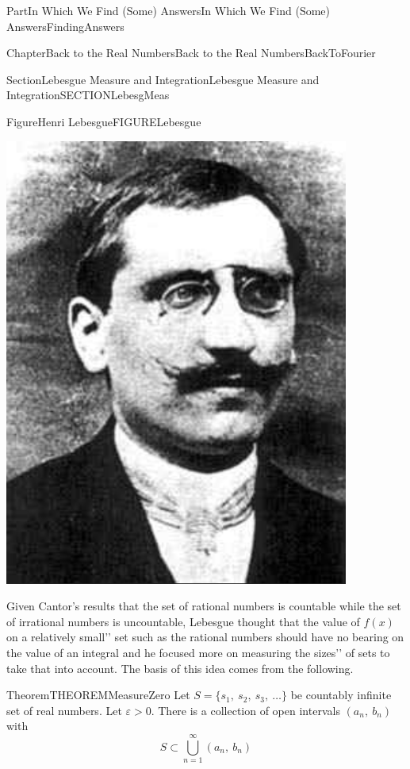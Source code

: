 \documentclass[oneside,10pt,]{book}
\numberwithin{equation}{part}
\newcommand{\eps}{\varepsilon}
\begin{document}
\begin{partptx}{Part}{In Which We Find (Some) Answers}{}{In Which We Find (Some) Answers}{}{}{FindingAnswers}
\begin{chapterptx}{Chapter}{Back to the Real Numbers}{}{Back to the Real Numbers}{}{}{BackToFourier}
\begin{sectionptx}{Section}{Lebesgue Measure and Integration}{}{Lebesgue Measure and Integration}{}{}{SECTIONLebesgMeas}
\begin{figureptx}{Figure}{Henri Lebesgue}{FIGURELebesgue}{}
\begin{image}{0.3}{0.4}{0.3}{}
\includegraphics[width=\linewidth]{external/images/Lebesgue.png}
\end{image}%
\tcblower
\end{figureptx}%
Given Cantor's results that the set of rational numbers is countable while the set of irrational numbers is uncountable, Lebesgue thought that the value of \(f\left(x\right)\) on a relatively \textasciigrave{}\textasciigrave{}small'{}'{} set such as the rational numbers should have no bearing on the value of an integral and he focused more on measuring the \textasciigrave{}\textasciigrave{}sizes'{}'{} of sets to take that into account.  The basis of this idea comes from the following.%
\begin{theorem}{Theorem}{}{}{THEOREMMeasureZero}%
Let \(S=\{s_1,\ s_2,\ s_3,\ \dots \}\) be countably infinite set of real numbers.  Let \(\eps >0\).  There is a collection of open intervals \((a_n,\ b_n)\) with%
\begin{equation*}
S\subset \bigcup^{\infty }_{n=1}{\left(a_n,\ b_n\right)}

\end{equation*}
\end{theorem}
\end{sectionptx}
\end{chapterptx}
\end{partptx}
\end{document}
